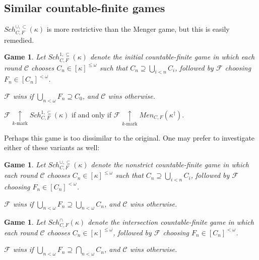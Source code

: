 \documentclass{beamer}
\theoremstyle{example}
\newtheorem{game}[theorem]{Game}
\theoremstyle{definition}
\newcommand{\kmarkwin}[1]{\underset{#1\text{-mark}}{\uparrow}}
\newcommand{\oneptlind}[1]{#1^\dagger} %
\newcommand{\menGame}[1]{Men_{C,F}\left({#1}\right)}
\newcommand{\schFillStrictGame}[1]{Sch^{\cup,\subset}_{C,F}\left({#1}\right)}
\newcommand{\schFillGame}[1]{Sch^{\cup,\subseteq}_{C,F}\left({#1}\right)}
\newcommand{\schFillInitialGame}[1]{Sch^{1,\subseteq}_{C,F}\left({#1}\right)}
\newcommand{\schFillIntGame}[1]{Sch^{\cap}_{C,F}\left({#1}\right)}
\newcommand{\<}{\langle}
\renewcommand{\>}{\rangle}
\newcommand{\pl}[1]{\mathscr{#1}}
\newcommand{\term}{\textit}
\begin{document}
\subsection{Similar countable-finite games}

\begin{frame}
  \(\schFillStrictGame\kappa\) is more restrictive than the Menger game,
  but this is easily remedied.

  \begin{game}
    Let \(\schFillInitialGame\kappa\) denote the
    \term{initial countable-finite game}
    in which each round \(\pl C\) chooses \(C_n\in[\kappa]^{\leq\omega}\)
    such that \(C_n\supseteq \bigcup_{i<n}C_i\),
    followed by \(\pl F\) choosing \(F_n\in[C_n]^{<\omega}\).

    \(\pl F\) wins if \(\bigcup_{n<\omega}F_n\supseteq C_0\),
    and \(\pl C\) wins otherwise.
  \end{game}

  \pause

  \begin{theorem}
    \(\pl F\kmarkwin{k}\schFillInitialGame\kappa\) if and only if
    \(\pl F\kmarkwin{k}\menGame{\oneptlind\kappa}\).
  \end{theorem}
\end{frame}

\begin{frame}
  Perhaps this game is too dissimilar to the original. One may prefer
  to investigate either of these variants as well:

  \pause

  \begin{game}
    Let \(\schFillGame\kappa\) denote the
    \term{nonstrict countable-finite game}
    in which each round \(\pl C\) chooses \(C_n\in[\kappa]^{\leq\omega}\)
    such that \(C_n\supseteq \bigcup_{i<n}C_i\),
    followed by \(\pl F\) choosing \(F_n\in[C_n]^{<\omega}\).

    \(\pl F\) wins if \(\bigcup_{n<\omega}F_n\supseteq \bigcup_{n<\omega}C_n\),
    and \(\pl C\) wins otherwise.
  \end{game}

  \begin{game}
    Let \(\schFillIntGame\kappa\) denote the
    \term{intersection countable-finite game}
    in which each round \(\pl C\) chooses \(C_n\in[\kappa]^{\leq\omega}\),
    followed by \(\pl F\) choosing \(F_n\in[C_n]^{<\omega}\).

    \(\pl F\) wins if \(\bigcup_{n<\omega}F_n\supseteq \bigcap_{n<\omega}C_n\),
    and \(\pl C\) wins otherwise.
  \end{game}
\end{frame}
\end{document}
